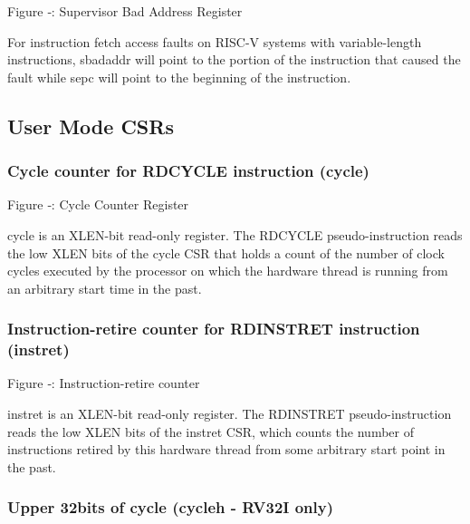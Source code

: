 \missingfigure{}

\protect\hypertarget{_Ref367099017}{}{}Figure ‑: Supervisor Bad Address
Register

For instruction fetch access faults on RISC-V systems with
variable-length instructions, sbadaddr will point to the portion of the
instruction that caused the fault while sepc will point to the beginning
of the instruction.

\protect\hypertarget{_Toc327108372}{}{}

\subsection{User Mode CSRs}\label{user-mode-csrs}

\subsubsection{Cycle counter for RDCYCLE instruction
(cycle)}\label{cycle-counter-for-rdcycle-instruction-cycle}

\missingfigure{}

Figure ‑: Cycle Counter Register

cycle is an XLEN-bit read-only register. The RDCYCLE pseudo-instruction
reads the low XLEN bits of the cycle CSR that holds a count of the
number of clock cycles executed by the processor on which the hardware
thread is running from an arbitrary start time in the past.

\subsubsection{Instruction-retire counter for RDINSTRET instruction
(instret)}\label{instruction-retire-counter-for-rdinstret-instruction-instret}

\missingfigure{}

Figure ‑: Instruction-retire counter

instret is an XLEN-bit read-only register. The RDINSTRET
pseudo-instruction reads the low XLEN bits of the instret CSR, which
counts the number of instructions retired by this hardware thread from
some arbitrary start point in the past.

\subsubsection{Upper 32bits of cycle (cycleh - RV32I
only)}\label{upper-32bits-of-cycle-cycleh---rv32i-only}

